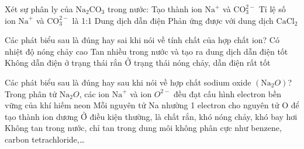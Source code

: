 \begin{ex}
	Xét sự phân ly của $\text{Na}_2\text{CO}_3$ trong nước:
	\choiceTF
	{\True Tạo thành ion $\text{Na}^+$ và $\text{CO}_3^{2-}$}
	{Tỉ lệ số ion $\text{Na}^+$ và $\text{CO}_3^{2-}$ là 1:1}
	{\True Dung dịch dẫn điện}
	{\True Phản ứng được với dung dịch $\text{CaCl}_2$}
	
\end{ex}
\begin{ex}
	Các phát biểu sau là đúng hay sai khi nói về tính chất của hợp chất ion?
	\choiceTF
	{\True Có nhiệt độ nóng chảy cao}
	{\True Tan nhiều trong nước và tạo ra dung dịch dẫn điện tốt}
	{\True Không dẫn điện ở trạng thái rắn}
	{\True Ở trạng thái nóng chảy, dẫn điện rất tốt}
	\loigiai{}
\end{ex}

\begin{ex}
	Các phát biểu sau là đúng hay sau khi nói về hợp chất sodium oxide $\left(\mathrm{Na}_2O\right)$?
	\choiceTF
	{\True Trong phân tử $\mathrm{Na}_2O$, các ion $\mathrm{Na}^{+}$ và ion $O^{2-}$ đều đạt cấu hình electron bền vững của khí hiếm neon}
	{\True Mỗi nguyên tử Na nhường 1 electron cho nguyên tử O để tạo thành ion dương}
	{\True Ở điều kiện thường, là chất rắn, khó nóng chảy, khó bay hơi}
	{Không tan trong nước, chỉ tan trong dung môi không phân cực như benzene, carbon tetrachloride,\ldots}
	\loigiai{}
\end{ex}

